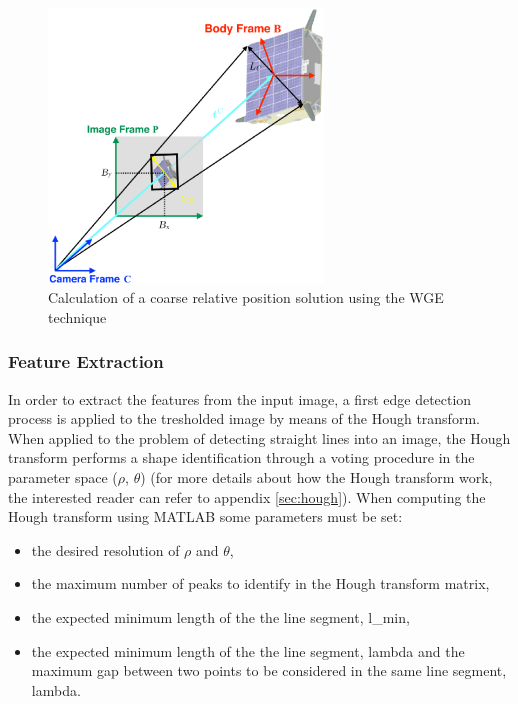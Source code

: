 \begin{figure}[htbp]
  \centering
  \includegraphics[width=0.65\textwidth]{gfx/coarsePoseEstimation.eps}
  \caption{Calculation of a coarse relative position solution using the WGE
    technique \cite{Sharma2018}}
  \label{fig:imageProcessingSubsystem}
\end{figure}

\subsubsection{Feature Extraction}\label{sec:featureextraction}
In order to extract the features from the input image, a first edge detection process is applied to the tresholded image by means of the Hough transform. When applied to the problem of detecting straight lines into an image, the Hough transform performs a shape identification through a voting procedure in the parameter space ($\rho$, $\theta$) (for more details about how the Hough transform work, the interested reader can refer to appendix \ref{sec:hough}).
When computing the Hough transform using MATLAB some parameters must be set:

\begin{itemize}
  \item the desired resolution of $\rho$ and $\theta$,
  \item the maximum number of peaks to identify in the Hough transform matrix,
  \item the expected minimum length of the the line segment, \gls{l_min},
  \item the expected minimum length of the the line segment, \gls{lambda} and the maximum gap between two points to be considered in the same line segment, \gls{lambda}.
\end{itemize}

